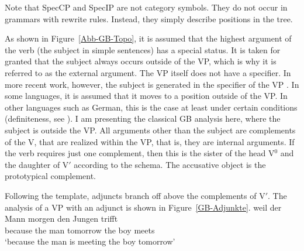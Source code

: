 Note that SpecCP and SpecIP are not category symbols. They do not occur in grammars with rewrite rules. Instead, they simply describe
positions in the tree.%

As shown in Figure~\ref{Abb-GB-Topo}, it is assumed that the highest argument of the verb (the subject in simple sentences) 
has a special status. It is taken for granted that the subject always occurs outside of the VP, which is why it is referred
to as the external argument. The VP itself does not have a specifier. In more recent work, however, the subject
is generated in the specifier of the VP \citep{FS86a-u,KS91a-u}. In some languages, it is assumed that it moves to a position
outside of the VP. In other languages such as German, this is the case at least under certain conditions (\eg definiteness, see
\citealp{Diesing92a}). I am presenting the classical GB analysis here, where the subject is outside the VP. All arguments other than
the subject are complements of the V, that are realized within the VP, that is, they are internal arguments. If the verb requires just one complement, then this is the
sister of the head V$^0$ and the daughter of V$'$ according to the \xbar schema. The accusative object is the prototypical complement.

Following the \xbar template, adjuncts branch off above the complements of V$'$. The analysis of a VP
with an adjunct is shown in Figure~\vref{GB-Adjunkte}.
\ea
\gll weil der Mann morgen den Jungen trifft\\
	 because the man tomorrow the boy meets\\
\glt `because the man is meeting the boy tomorrow'
\z

